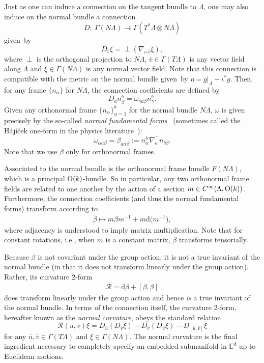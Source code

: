 \documentclass[pdftex]{sigma}
\numberwithin{equation}{section}
\renewcommand{\=}{\stackrel \Lambda =}
\begin{document}
Just as one can induce a connection on the tangent bundle to $\Lambda$, one may also induce on the normal bundle a connection
\[
D \colon \ \Gamma(N \Lambda) \rightarrow \Gamma(T^* \Lambda \otimes N \Lambda)
\]
given~by
\[
D_{\bar v} \xi = {\perp} (\nabla_{\iota_* \bar{v}} \xi) ,
\]
where $\perp$ is the orthogonal projection to $N \Lambda$, $\bar{v} \in \Gamma(T \Lambda)$ is any vector field along $\Lambda$ and $\xi \in \Gamma(N \Lambda)$ is any normal vector field. Note that this connection is compatible with the metric on the normal bundle given~by $\eta = g|_{\Lambda} - \iota^* g$. Then, for any frame $\{n_{\alpha}\}$ for $N \Lambda$, the connection coefficients are defined by
\[
D_a n^b_{\beta} = \omega_{\gamma a \beta} n^b_{\gamma} .
\]
Given any orthonormal frame $\{n_{\alpha}\}_{\alpha = 1}^k$ for the normal bundle $N \Lambda$, $\omega$ is given precisely by the so-called \textit{normal fundamental forms}~\cite{Spivak} (sometimes called the H{\'a}j{\'i}{\v{c}}ek one-form in the physics literature~\cite{hajicek1975, hajicek1973}):
\[
\omega_{\alpha a \beta} = \beta_{a \alpha \beta} := n^b_{\alpha} \nabla^\top_a n_{b \beta} .
\]
Note that we use $\beta$ only for orthonormal frames.

Associated to the normal bundle is the orthonormal frame bundle $F(N \Lambda)$, which is a principal ${\rm O}(k)$-bundle. So in particular, any two orthonormal frame fields are related to one another by the action of a section $m \in C^\infty(\Lambda, {\rm O}(k))$. Furthermore, the connection coefficients (and thus the normal fundamental forms) transform according to
\begin{align} \label{beta-transf}
\beta \mapsto m \beta m^{-1} + m \mathrm{d} \bigl(m^{-1}\bigr) ,
\end{align}
where adjacency is understood to imply matrix multiplication.
Note that for constant rotations, i.e., when $m$ is a constant matrix, $\beta$ transforms tensorially.

Because $\beta$ is not covariant under the group action, it is not a true invariant of the normal bundle (in that it does not transform linearly under the group action). Rather, its curvature 2-form
\begin{align} \label{norm-curv}
\mathcal{R} = \mathrm{d} \beta + [\beta, \beta]
\end{align}
does transform linearly under the group action and hence \textit{is} a true invariant of the normal bundle. In terms of the connection itself, the curvature 2-form, hereafter known as the \textit{normal curvature}, obeys the standard relation
\[
\mathcal{R}(\bar{u},\bar{v}) \xi = D_{\bar{u}} (D_{\bar{v}} \xi) - D_{\bar{v}} (D_{\bar{u}} \xi) - D_{[\bar{u},\bar{v}]} \xi
\]
for any $\bar{u},\bar{v} \in \Gamma(T \Lambda)$ and $\xi \in \Gamma(N \Lambda)$. The normal curvature is the final ingredient necessary to completely specify an embedded submanifold in $\mathbb{E}^d$ up to Euclidean motions.
\end{document}
